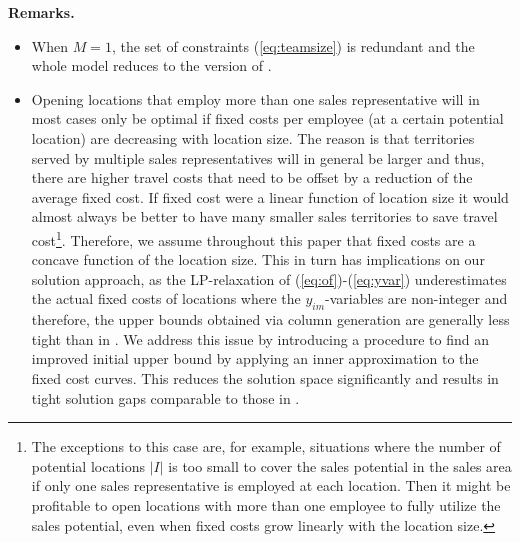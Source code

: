 \documentclass[12pt]{scrartcl}
\begin{document}
\textbf{Remarks.} \begin{itemize}
    \item When $M=1$, the set of constraints (\ref{eq:teamsize}) is redundant and the whole model reduces to the version of \cite{Haase2014}. 
    \item Opening locations that employ more than one sales representative will in most cases only be optimal if fixed costs per employee (at a certain potential location) are decreasing with location size. The reason is that territories served by multiple sales representatives will in general be larger and thus, there are higher travel costs that need to be offset by a reduction of the average fixed cost. If fixed cost were a linear function of location size it would almost always be better to have many smaller sales territories to save travel cost\footnote{The exceptions to this case are, for example, situations where the number of potential locations $|I|$ is too small to cover the sales potential in the sales area if only one sales representative is employed at each location. Then it might be profitable to open locations with more than one employee to fully utilize the sales potential, even when fixed costs grow linearly with the location size.}. Therefore, we assume throughout this paper that fixed costs are a concave function of the location size. This in turn has implications on our solution approach, as the LP-relaxation of (\ref{eq:of})-(\ref{eq:yvar}) underestimates the actual fixed costs of locations where the  $y_{im}$-variables are non-integer and therefore, the upper bounds obtained via column generation are generally less tight than in \cite{Haase2014}. We address this issue by introducing a procedure to find an improved initial upper bound by applying an inner approximation to the fixed cost curves. This reduces the solution space significantly and results in tight solution gaps comparable to those in \cite{Haase2014}.
\end{itemize}
\end{document}
